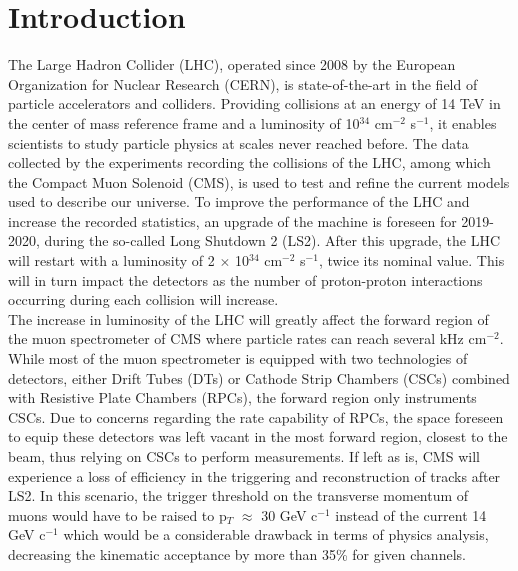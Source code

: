 \chapter*{Introduction}
\label{chap:0-4-introduction}

  \vspace{2cm}

  The Large Hadron Collider (LHC), operated since 2008 by the European Organization for Nuclear Research (CERN), is state-of-the-art in the field of particle accelerators and colliders. Providing collisions at an energy of 14 TeV in the center of mass reference frame and a luminosity of 10$^{34}$ cm$^{-2}$ s$^{-1}$, it enables scientists to study particle physics at scales never reached before. The data collected by the experiments recording the collisions of the LHC, among which the Compact Muon Solenoid (CMS), is used to test and refine the current models used to describe our universe. To improve the performance of the LHC and increase the recorded statistics, an upgrade of the machine is foreseen for 2019-2020, during the so-called Long Shutdown 2 (LS2). After this upgrade, the LHC will restart with a luminosity of 2 $\times$ 10$^{34}$ cm$^{-2}$ s$^{-1}$, twice its nominal value. This will in turn impact the detectors as the number of proton-proton interactions occurring during each collision will increase. \\

  The increase in luminosity of the LHC will greatly affect the forward region of the muon spectrometer of CMS where particle rates can reach several kHz cm$^{-2}$. While most of the muon  spectrometer is equipped with two technologies of detectors, either Drift Tubes (DTs) or Cathode Strip Chambers (CSCs) combined with Resistive Plate Chambers (RPCs), the forward region only instruments CSCs. Due to concerns regarding the rate capability of RPCs, the space foreseen to equip these detectors was left vacant in the most forward region, closest to the beam, thus relying on CSCs to perform measurements. If left as is, CMS will experience a loss of efficiency in the triggering and reconstruction of tracks after LS2. In this scenario, the trigger threshold on the transverse momentum of muons would have to be raised to p$_T$ $ \approx $ 30 GeV c$^{-1}$ instead of the current 14 GeV c$^{-1}$ which would be a considerable drawback in terms of physics analysis, decreasing the kinematic acceptance by more than 35\% for given channels. \\

